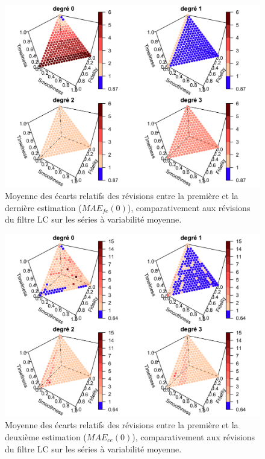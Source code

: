 \documentclass[
  12pt,
  french,
  12pt,a4paper]{article}
\newcommand\1{\mathds{1}}
\begin{document}
\begin{figure}

{\centering \includegraphics[width=0.9\linewidth]{img/simulations/fst_mediumvariability_fe_q0} 

}

\caption[Moyenne des écarts relatifs des révisions entre la première et la dernière estimation (\(MAE_{fe}(0)\)), comparativement aux révisions du filtre LC sur les séries à variabilité moyenne]{Moyenne des écarts relatifs des révisions entre la première et la dernière estimation (\(MAE_{fe}(0)\)), comparativement aux révisions du filtre LC sur les séries à variabilité moyenne.}\label{fig:graphsfeq0simulfst}

\footnotesize
\normalsize\end{figure}

\begin{figure}

{\centering \includegraphics[width=0.9\linewidth]{img/simulations/fst_mediumvariability_ceq0} 

}

\caption[Moyenne des écarts relatifs des révisions entre la première et la deuxième estimation (\(MAE_{ce}(0)\)), comparativement aux révisions du filtre LC sur les séries à variabilité moyenne]{Moyenne des écarts relatifs des révisions entre la première et la deuxième estimation (\(MAE_{ce}(0)\)), comparativement aux révisions du filtre LC sur les séries à variabilité moyenne.}\label{fig:graphsceq0simulfst}

\footnotesize
\normalsize\end{figure}
\end{document}
